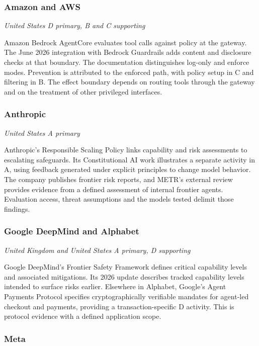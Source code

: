 \subsubsection{Amazon and AWS}

\textit{United States  \textbullet{}  D primary, B and C supporting}

Amazon Bedrock AgentCore evaluates tool calls against policy at the gateway. The June 2026 integration with Bedrock Guardrails adds content and disclosure checks at that boundary. The documentation distinguishes log-only and enforce modes. Prevention is attributed to the enforced path, with policy setup in C and filtering in B. The effect boundary depends on routing tools through the gateway and on the treatment of other privileged interfaces.~\cite{src9,src10}

\subsubsection{Anthropic}

\textit{United States  \textbullet{}  A primary}

Anthropic's Responsible Scaling Policy links capability and risk assessments to escalating safeguards. Its Constitutional AI work illustrates a separate activity in A, using feedback generated under explicit principles to change model behavior. The company publishes frontier risk reports, and METR's external review provides evidence from a defined assessment of internal frontier agents. Evaluation access, threat assumptions and the models tested delimit those findings.~\cite{src31,src32,src33}

\subsubsection{Google DeepMind and Alphabet}

\textit{United Kingdom and United States  \textbullet{}  A primary, D supporting}

Google DeepMind's Frontier Safety Framework defines critical capability levels and associated mitigations. Its 2026 update describes tracked capability levels intended to surface risks earlier. Elsewhere in Alphabet, Google's Agent Payments Protocol specifies cryptographically verifiable mandates for agent-led checkout and payments, providing a transaction-specific D activity. This is protocol evidence with a defined application scope.~\cite{src26,src32,src34}

\subsubsection{Meta}

